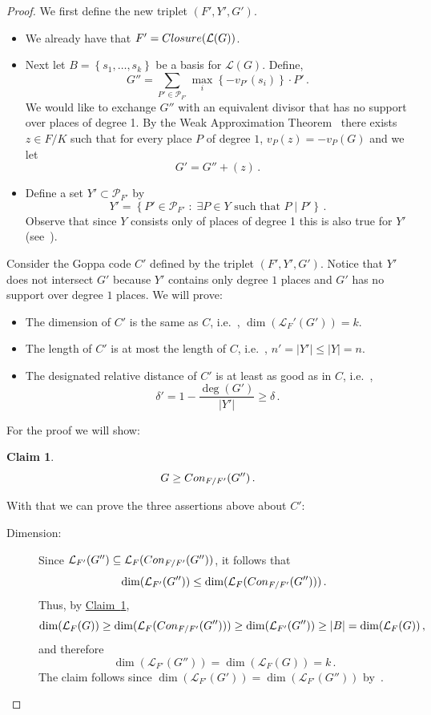 \documentclass[10pt]{article}
\newtheorem{claim}[theorem]{Claim}
\theoremstyle{definition}
\providecommand{\ie}{i.e.\ }
\numberwithin{equation}{section}
\newcommand{\expref}[2]{\texorpdfstring{\hyperref[#2]{#1~\ref{#2}}}{#1~\ref{#2}}}
\newcommand{\cL}{\mathcal{L}}
\newcommand{\set}[1]{{\left\{#1\right\}}}
\newcommand{\AllPl}{{\mathcal{P}}}
\newcommand{\closure}{{\rm Closure}}
\newcommand{\con}{{\rm Con}}
\begin{document}
\begin{proof}
%
%
%
%




We first define the new triplet $(F',Y',G')$.

\begin{itemize}
\item
We already have that $F' = \closure(\cL(G))$.

\item
Next let $B=\set{s_1,\ldots,s_{k}}$ be a basis for $\cL(G)$. Define,
$$G'' = \sum_{P' \in \AllPl_{F'}} \max_i
\set {-v_{P'}(s_i)} \cdot P'\,.$$ We would like to exchange $G''$ with
an equivalent divisor that has no support over places of degree 1.
By the Weak Approximation Theorem~\cite[Thm I.3.1]{S:93} there
exists $z\in F/K$ such that for every place $P$ of degree $1$,
$v_P(z) = -v_P(G)$ and we let $$G' = G'' + (z)\,.$$

\item
Define a set $Y' \subset \AllPl_{F'}$ by
$$ Y' = \set{ P' \in \AllPl_{F'} \;:\; \text{$\exists P \in Y$ such
    that $P\mid P'$}}\,.$$
Observe that since $Y$ consists only of places of degree 1 this is
also true for $Y'$ (see~\cite[Proposition III.1.6]{S:93}).
\end{itemize}

Consider the Goppa code $C'$ defined by the triplet $(F',Y',G')$.
Notice that $Y'$ does not intersect $G'$ because $Y'$ contains only
degree $1$ places and $G'$ has no support over degree $1$ places. We
will prove:
\begin{itemize}
  \item The dimension of $C'$ is the same as $C$, \ie, $\dim(\cL_F'(G'))=k$.
  \item The length of $C'$ is at most the length of $C$, \ie, $n'=|Y'| \le |Y| = n$.
  \item The designated relative distance of $C'$ is at least as good as in $C$, \ie,
$$\delta' = 1 - \frac{\deg(G')}{|Y'|} \ge \delta\,.$$
\end{itemize}

For the proof we will show:

\begin{claim}
\label{cl:conorm}
$$G \ge \con_{F/F'}(G'')\,.$$
\end{claim}

With that we can prove the three assertions above about $C'$:

\begin{description}
\item [Dimension:]
Since $\cL_{F'}(G'') \subseteq \cL_F(\con_{F/F'}(G''))$, it follows
that $$\dim(\cL_{F'}(G'')) \le \dim(\cL_F(\con_{F/F'}(G'')))\,.$$ Thus,
by \expref{Claim}{cl:conorm},
$$\dim(\cL_F(G)) \ge \dim( \cL_F(\con_{F/F'}(G''))) \ge \dim(\cL_{F'}(G'')) \ge
|B| = \dim(\cL_F(G))\,,$$ and therefore
$$\dim(\cL_{F'}(G''))=\dim(\cL_F(G))=k\,.$$
The claim follows since $\dim(\cL_{F'}(G'))=\dim(\cL_{F'}(G''))$ by~\cite[Lemma I.4.6]{S:93}.


\end{description}
\end{proof}
\end{document}
